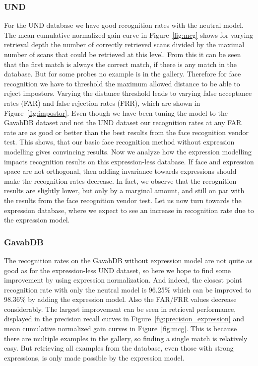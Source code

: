 \documentclass[10pt,twocolumn,letterpaper]{article}
\begin{document}
\subsubsection{UND}
For the UND database we have good recognition rates with the neutral
model. The mean cumulative normalized gain curve in
Figure~\ref{fig:mcg} shows for varying retrieval depth the number of
correctly retrieved scans divided by the maximal number of scans that could be
retrieved at this level. From this it can be seen that the first match is
always the correct match, if there is any match in the database. But for some
probes no example is in the gallery. Therefore for face recognition we have to
threshold the maximum allowed distance to be able to reject impostors. Varying
the distance threshold leads to varying false acceptance rates (FAR) and false
rejection rates (FRR), which are shown in Figure~\ref{fig:impostor}. Even
though we have been tuning the model to the GavabDB dataset and not the UND
dataset our recognition rates at any FAR rate are as good or better than the
best results from the face recognition vendor test. This shows, that our basic
face recognition method without expression modelling gives convincing results.
Now we analyze how the expression modelling impacts recognition results on this
expression-less database. If face and expression space are not orthogonal, then
adding invariance towards expressions should make the recognition rates
decrease. In fact, we observe that the recognition results are slightly lower,
but only by a marginal amount, and still on par with the results from the face
recognition vendor test. Let us now turn towards the expression database, where
we expect to see an increase in recognition rate due to the expression model.

\subsubsection{GavabDB}
The recognition rates on the GavabDB without expression model are not quite as
good as for the expression-less UND dataset, so here we hope to find some
improvement by using expression normalization. And indeed, the closest point
recognition rate with only the neutral model is 96.25\% which can be improved
to 98.36\% by adding the expression model. Also the FAR/FRR values decrease
considerably. The largest improvement can be seen  in retrieval performance,
displayed in the precision recall curves in
Figure~\ref{fig:precision_expression} and mean cumulative normalized gain
curves in Figure~\ref{fig:mcg}. This is because there are multiple examples in
the gallery, so finding a single match is relatively easy. But retrieving all
examples from the database, even those with strong expressions, is only made
possible by the expression model.
\end{document}

